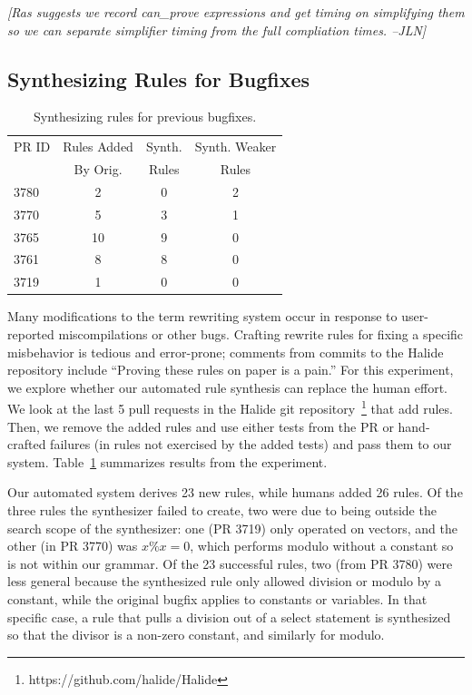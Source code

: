 \documentclass[sigplan,10pt,review,anonymous]{acmart}\settopmatter{printfolios=true,printccs=false,printacmref=false}
\newcommand{\jln}[1]{\textcolor{uwpurple}{\textit{[{#1} --JLN]}}}
\begin{document}
\jln{Ras suggests we record can\_prove expressions and get timing on simplifying them so we can separate simplifier timing from the full compliation times.}



\subsection{Synthesizing Rules for Bugfixes}
\begin{table}
  \caption{Synthesizing rules for previous bugfixes.}
  \label{tab:prbugfixes}
  \begin{tabular}{lccc}
    PR ID & Rules Added & Synth. & Synth. Weaker\\
          & By Orig.    & Rules  & Rules\\\hline
    3780 & 2 & 0 & 2\\
    3770 & 5 & 3 & 1\\
    3765 & 10 & 9 & 0\\
    3761 & 8 & 8 & 0\\
    3719 & 1 & 0 & 0\\
  \end{tabular}
\end{table}
Many modifications to the term rewriting system occur in response to user-reported
miscompilations or other bugs.  Crafting rewrite rules for fixing a specific misbehavior
is tedious and error-prone; comments from commits to the Halide repository include
``Proving these rules on paper is a pain.''  For this experiment, we explore whether
our automated rule synthesis can replace the human effort.  We look at the last 5 pull
requests in the Halide git repository~\footnote{https://github.com/halide/Halide} that add rules.  Then, we remove
the added rules and use either tests from the PR or hand-crafted failures (in rules
not exercised by the added tests) and pass them to our system.
Table~\ref{tab:prbugfixes} summarizes results from the experiment.

Our automated system derives 23 new rules, while humans added 26 rules.  Of the three
rules the synthesizer failed to create, two were due to being outside the search scope
of the synthesizer: one (PR 3719) only operated on vectors, and the other (in PR 3770) was $x \% x = 0$, which
performs modulo without a constant so is not within our grammar.  Of the 23 successful
rules, two (from PR 3780) were less general because the synthesized rule only allowed division
or modulo by a constant, while the original bugfix applies to constants or variables.
In that specific case, a rule that pulls a division out of a select statement
is synthesized so that the divisor is a non-zero constant, and similarly for modulo.
\end{document}
